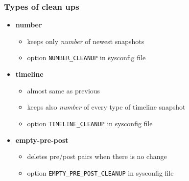 \documentclass{beamer}
\begin{document}
\begin{frame}[t]
\frametitle{Types of clean ups}
\begin{itemize}
   \item \textbf{number}
   \begin{itemize}
      \item keeps only \textit{number} of newest snapshots
      \item option \texttt{NUMBER\_CLEANUP} in sysconfig file
   \end{itemize}
   \item \textbf{timeline}
   \begin{itemize}
      \item almost same as previous
      \item keeps also \textit{number} of every type of timeline snapshot
      \item option \texttt{TIMELINE\_CLEANUP} in sysconfig file
   \end{itemize}
   \item \textbf{empty-pre-post}
   \begin{itemize}
      \item deletes pre/post pairs when there is no change
      \item option \texttt{EMPTY\_PRE\_POST\_CLEANUP} in sysconfig file
   \end{itemize}
\end{itemize}
\end{frame}
\end{document}
